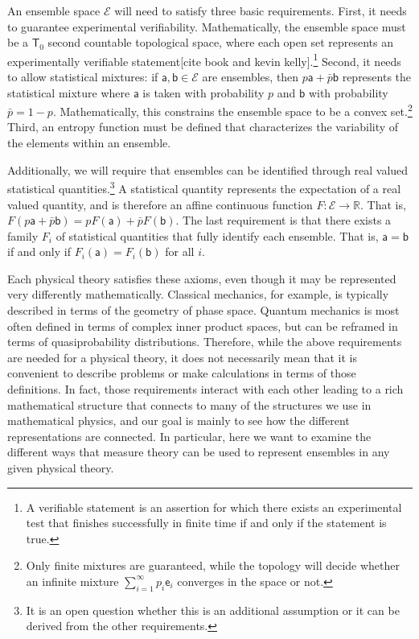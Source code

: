 \documentclass[10pt,twocolumn, nofootinbib]{revtex4-2}
\newcommand{\ens}[1][e] {\mathsf{#1}} %
\newcommand{\Ens}[1][E] {\mathcal{#1}} %
\begin{document}
An ensemble space $\Ens$ will need to satisfy three basic requirements. First, it needs to guarantee experimental verifiability. Mathematically, the ensemble space must be a $\mathsf{T}_0$ second countable topological space, where each open set represents an experimentally verifiable statement[cite book and kevin kelly].\footnote{A verifiable statement is an assertion for which there exists an experimental test that finishes successfully in finite time if and only if the statement is true.} Second, it needs to allow statistical mixtures: if $\ens[a],\ens[b] \in \Ens$ are ensembles, then $p \ens[a] + \bar{p} \ens[b]$ represents the statistical mixture where $\ens[a]$ is taken with probability $p$ and $\ens[b]$ with probability $\bar{p} = 1 - p$. Mathematically, this constrains the ensemble space to be a convex set.\footnote{Only finite mixtures are guaranteed, while the topology will decide whether an infinite mixture $\sum_{i=1}^{\infty} p_i \ens_i$ converges in the space or not.} Third, an entropy function must be defined that characterizes the variability of the elements within an ensemble.

Additionally, we will require that ensembles can be identified through real valued statistical quantities.\footnote{It is an open question whether this is an additional assumption or it can be derived from the other requirements.} A statistical quantity represents the expectation of a real valued quantity, and is therefore an affine continuous function $F : \Ens \to \mathbb{R}$. That is, $F(p \ens[a] + \bar{p} \ens[b]) = p F(\ens[a]) + \bar{p} F(\ens[b])$. The last requirement is that there exists a family $F_i$ of statistical quantities that fully identify each ensemble. That is, $\ens[a] = \ens[b]$ if and only if $F_i(\ens[a]) = F_i(\ens[b])$ for all $i$.

Each physical theory satisfies these axioms, even though it may be represented very differently mathematically. Classical mechanics, for example, is typically described in terms of the geometry of phase space. Quantum mechanics is most often defined in terms of complex inner product spaces, but can be reframed in terms of quasiprobability distributions. Therefore, while the above requirements are needed for a physical theory, it does not necessarily mean that it is convenient to describe problems or make calculations in terms of those definitions. In fact, those requirements interact with each other leading to a rich mathematical structure that connects to many of the structures we use in mathematical physics, and our goal is mainly to see how the different representations are connected. In particular, here we want to examine the different ways that measure theory can be used to represent ensembles in any given physical theory.
\end{document}
